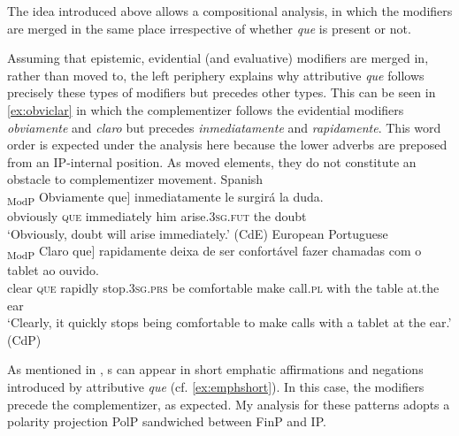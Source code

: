 The idea introduced above allows a  compositional analysis, in which the modifiers are merged in the same place  irrespective of whether \emph{que} is present or not.  

Assuming that epistemic, evidential (and evaluative) modifiers are merged in, rather than moved to, the left periphery explains why attributive \emph{que} follows precisely these types of modifiers but precedes other  types. This can be seen in \eqref{ex:obviclar} in which the complementizer follows the evidential modifiers \emph{obviamente} and \emph{claro} but precedes \emph{inmediatamente} and \emph{rapidamente}. This word order is expected under the analysis here because the lower adverbs are preposed from an IP-internal position. As moved elements, they do not constitute an obstacle to complementizer movement.
\ea\label{ex:obviclar}
\ea \label{ex:obvim}
		Spanish\\
\gll  {\ob}\textsubscript{ModP} Obviamente que] inmediatamente le surgirá la duda. \\
{} obviously \textsc{que} immediately him arise.\textsc{3sg.fut} the doubt\\
\glt  `Obviously,  doubt will arise immediately.' (CdE)
\ex \label{ex:clarrap}
European Portuguese\\ 
\gll  {\ob}\textsubscript{ModP} Claro que] rapidamente {deixa de} ser confortável fazer chamadas com o tablet ao ouvido. \\
{} clear \textsc{que} rapidly stop.\textsc{3sg.prs} be comfortable make call.\textsc{pl} with the table at.the ear\\
\glt `Clearly, it quickly stops being comfortable to make calls with a tablet at the ear.' (CdP)
\z
\z  


As   mentioned  in , s can  appear in  short emphatic affirmations and negations introduced by attributive \emph{que} (cf. \ref{ex:emphshort}). In this case, the modifiers precede the complementizer, as expected. My  analysis for these patterns adopts  a polarity projection PolP sandwiched between FinP and IP. 
 
